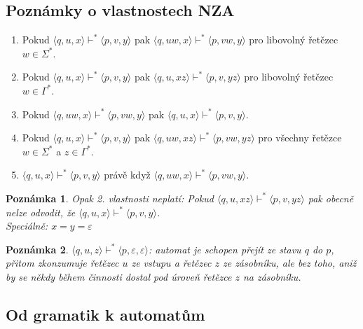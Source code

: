 \documentclass[10pt, a4paper, titlepage]{article}
\theoremstyle{note}
\newtheorem{poznamka}{Poznámka}
\begin{document}
\subsection{Poznámky o vlastnostech NZA}

\begin{enumerate}
\item 
Pokud $\langle q,u,x \rangle \vdash^* \langle p,v,y \rangle$ pak $\langle q,uw,x \rangle \vdash^* \langle p,vw,y \rangle$ pro libovolný řetězec $w \in \Sigma^*$.

\item
Pokud $\langle q,u,x \rangle \vdash^* \langle p,v,y \rangle$ pak $\langle q,u,xz \rangle \vdash^* \langle p,v,yz \rangle$ pro libovolný řetězec $w \in \Gamma^*$.

\item
Pokud $\langle q,uw,x \rangle \vdash^* \langle p,vw,y \rangle$ pak $\langle q,u,x \rangle \vdash^* \langle p,v,y \rangle$.

\item[1.+2.]
Pokud $\langle q,u,x \rangle \vdash^* \langle p,v,y \rangle$ pak $\langle q,uw,xz \rangle \vdash^* \langle p,vw,yz \rangle$ pro všechny řetězce $w \in \Sigma^* $ a $z \in \Gamma^*$.

\item[1.+3.]
$\langle q,u,x \rangle \vdash^* \langle p,v,y \rangle$ právě když $\langle q,uw,x \rangle \vdash^* \langle p,vw,y \rangle$.
\end{enumerate}

\begin{poznamka}
Opak 2. vlastnosti neplatí: Pokud $\langle q,u,xz \rangle \vdash^* \langle p,v,yz \rangle$ pak obecně nelze odvodit, že $\langle q,u,x \rangle \vdash^* \langle p,v,y \rangle$.\\
Speciálně: $x=y=\varepsilon$
\end{poznamka}

\begin{poznamka}
$\langle q,u,z \rangle \vdash^* \langle p,\varepsilon,\varepsilon \rangle$: automat je schopen přejít ze stavu $q$ do $p$, přitom zkonzumuje řetězec $u$ ze vstupu a řetězec $z$ ze zásobníku, ale bez toho, aniž by se někdy během činnosti dostal pod úroveň řetězce $z$ na zásobníku.
\end{poznamka}

\subsection{Od gramatik k automatům}
\end{document}
